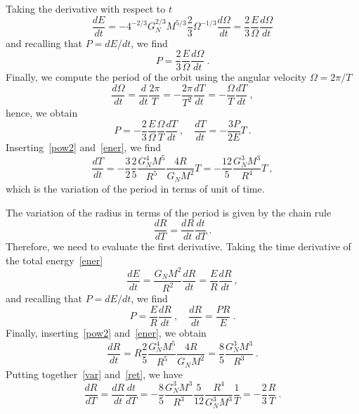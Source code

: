 \documentclass[a4paper]{article}
\newcommand{\dv}[2]{\frac{d#1}{d#2}}
\begin{document}
    Taking the derivative with respect to $t$
    \begin{equation*}
        \dv{E}{t} = - 4^{-2/3} G_N^{2/3} M^{5/3} \frac{2}{3} \Omega^{-1/3} \dv{\Omega}{t} = \frac{2}{3} \frac{E}{\Omega} \dv{\Omega}{t} 
    \end{equation*}
    and recalling that $P = dE / dt$, we find 
    \begin{equation*}
        P = \frac{2}{3} \frac{E}{\Omega} \dv{\Omega}{t} ~.
    \end{equation*}
    Finally, we compute the period of the orbit using the angular velocity $\Omega = 2 \pi / T$
    \begin{equation*}
        \dv{\Omega}{t} = \dv{}{t} \frac{2\pi}{T} = - \frac{2\pi}{T^2} \dv{T}{t} = - \frac{\Omega}{T} \dv{T}{t} ~,
    \end{equation*}
    hence, we obtain 
    \begin{equation*}
        P = - \frac{2}{3} \frac{E}{\Omega} \frac{\Omega}{T} \dv{T}{t} ~, \quad \dv{T}{t} = - \frac{3 P}{2 E} T ~. 
    \end{equation*}
    Inserting~\eqref{pow2} and~\eqref{ener}, we find
    \begin{equation}\label{var}
        \dv{T}{t} = - \frac{3}{2} \frac{2}{5} \frac{G_N^4 M^5}{R^5} \frac{4 R}{G_N M^2} T = - \frac{12}{5} \frac{G_N^3 M^3}{R^4} T ~,
    \end{equation}
    which is the variation of the period in terms of unit of time.

    The variation of the radius in terms of the period is given by the chain rule
    \begin{equation*}
        \dv{R}{T} = \dv{R}{t} \dv{t}{T} ~.
    \end{equation*}
    Therefore, we need to evaluate the first derivative. Taking the time derivative of the total energy~\eqref{ener}
    \begin{equation*}
        \dv{E}{t} = \frac{G_N M^2}{R^2} \dv{R}{t} = \frac{E}{R} \dv{R}{t} ~,
    \end{equation*}
    and recalling that $P = dE / dt$, we find 
    \begin{equation*}
        P = \frac{E}{R} \dv{R}{t} ~, \quad \dv{R}{t} = \frac{P R}{E} ~.
    \end{equation*}
    Finally, inserting~\eqref{pow2} and~\eqref{ener}, we obtain
    \begin{equation}\label{ret}
        \dv{R}{t} = R \frac{2}{5} \frac{G_N^4 M^5}{R^5} \frac{4 R}{G_N M^2} = \frac{8}{5} \frac{G_N^3 M^3}{R^3} ~.
    \end{equation}
    Putting together~\eqref{var} and~\eqref{ret}, we have
    \begin{equation*}
        \dv{R}{T} = \dv{R}{t} \dv{t}{T} = - \frac{8}{5} \frac{G_N^3 M^3}{R^3} \frac{5}{12} \frac{R^4}{G_N^3 M^3} \frac{1}{T} = - \frac{2}{3} \frac{R}{T} ~.
    \end{equation*}
\end{document}
